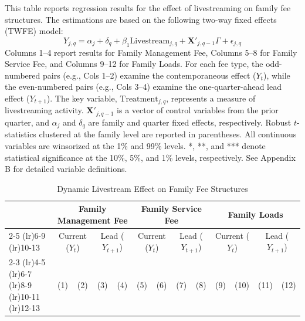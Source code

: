 \begin{landscape}
    \begin{table}[!ht]
        \caption{Dynamic Livestream Effect on Family Fee Structures}\label{tab:family_twfe_fee_reallocation}
        \footnotesize{
        This table reports regression results for the effect of livestreaming on family fee structures. The estimations are based on the following two-way fixed effects (TWFE) model:
        \[ Y_{j,q} = \alpha_j + \delta_q + \beta_1 \text{Livestream}_{j,q} + \mathbf{X}'_{j,q-1} \Gamma + \epsilon_{j,q} \]
        Columns 1--4 report results for Family Management Fee, Columns 5--8 for Family Service Fee, and Columns 9--12 for Family Loads. For each fee type, the odd-numbered pairs (e.g., Cols 1--2) examine the contemporaneous effect ($Y_{t}$), while the even-numbered pairs (e.g., Cols 3--4) examine the one-quarter-ahead lead effect ($Y_{t+1}$). The key variable, $\text{Treatment}_{j,q}$, represents a measure of livestreaming activity. $\mathbf{X}'_{j,q-1}$ is a vector of control variables from the prior quarter, and $\alpha_j$ and $\delta_q$ are family and quarter fixed effects, respectively. Robust $t$-statistics clustered at the family level are reported in parentheses. All continuous variables are winsorized at the 1\% and 99\% levels. *, **, and *** denote statistical significance at the 10\%, 5\%, and 1\% levels, respectively. See Appendix B for detailed variable definitions.}

        \vspace{.1in}
        \centering

        \bgroup%
        \def\sym#1{\ifmmode^{#1}\else\(^{#1}\)\fi}
        \setlength{\tabcolsep}{3pt} %
        \small
        \renewcommand{\arraystretch}{0.9} %

        \begin{tabular}{l*{12}{c}}
            \toprule
            & \multicolumn{4}{c}{\textbf{Family Management Fee}} & \multicolumn{4}{c}{\textbf{Family Service Fee}} & \multicolumn{4}{c}{\textbf{Family Loads}} \\
            \cmidrule(lr){2-5} \cmidrule(lr){6-9} \cmidrule(lr){10-13}
            & \multicolumn{2}{c}{Current ($Y_{t}$)} & \multicolumn{2}{c}{Lead ($Y_{t+1}$)} & \multicolumn{2}{c}{Current ($Y_{t}$)} & \multicolumn{2}{c}{Lead ($Y_{t+1}$)} & \multicolumn{2}{c}{Current ($Y_{t}$)} & \multicolumn{2}{c}{Lead ($Y_{t+1}$)} \\
            \cmidrule(lr){2-3} \cmidrule(lr){4-5} \cmidrule(lr){6-7} \cmidrule(lr){8-9} \cmidrule(lr){10-11} \cmidrule(lr){12-13}
            & (1) & (2) & (3) & (4) & (5) & (6) & (7) & (8) & (9) & (10) & (11) & (12) \\
            \midrule
            

\end{tabular}
\end{table}
\end{landscape}
